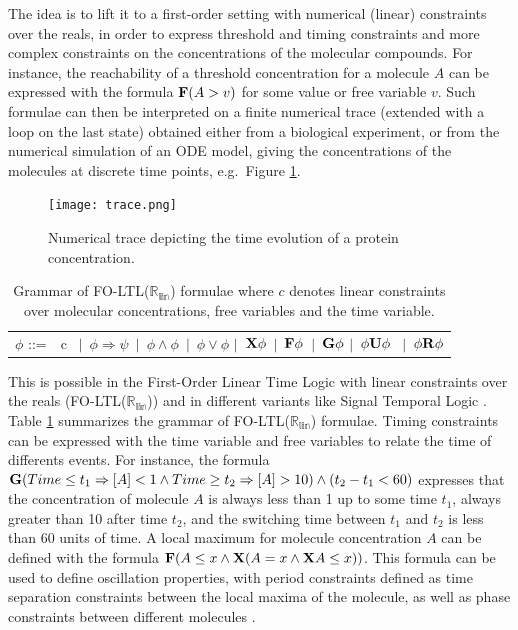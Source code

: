 \documentclass[graybox]{svmult}
\def\Rlin{\mathbb{R_{\mbox{lin}}}}
\def\F{{\bf F}}
\def\G{{\bf G}}
\def\X{{\bf X}}
\def\U{{\bf U}}
\def\R{{\bf R}}
\begin{document}
The idea is to lift it to a first-order setting with numerical (linear) constraints over the reals,
in order to express threshold and timing constraints and more complex constraints on the concentrations of the molecular compounds.
For instance, the reachability of a threshold concentration for a molecule $A$
can be expressed with the formula $\F(A>v)$ for some value or free variable $v$.
Such formulae can then be interpreted on a finite numerical trace (extended with a loop on the last state)
obtained either from a biological experiment, 
or from the numerical simulation of an ODE model,
giving the concentrations of the molecules at discrete time points, e.g.~Figure \ref{trace}.


\begin{figure}[htbp]
\centering
\texttt{[image: trace.png]} %
\caption{ \label{trace} Numerical trace depicting the time evolution of a protein concentration.}
\end{figure}


\begin{table}[htb]
\it
\begin{center}
\begin{tabular}{ll}
$\phi$ ::=& c \ $|$\  $\phi\Rightarrow\psi$\ $|$\  $\phi\wedge\phi$\ $|$\  $\phi\vee\phi$ 
   $|$\   $\X\phi$\ $|$\   $\F\phi$\ $|$\  $ \G\phi$ 
   $|$\  $\phi\U\phi$ \ $|$\  $\phi\R\phi$\\
\end{tabular}
\end{center}
\caption{Grammar of FO-LTL($\Rlin$) formulae where $c$ denotes linear constraints over molecular concentrations,
free variables and the time variable.}
\label{foltl}
\end{table}

This is possible in the First-Order Linear Time Logic with linear constraints over the reals (FO-LTL($\Rlin$))
and in different variants like Signal Temporal Logic \cite{DM10formats}.
Table \ref{foltl} summarizes the grammar of FO-LTL($\Rlin$) formulae.
Timing constraints can be expressed with the time variable and free variables to relate 
the time of differents events.
For instance, the formula $\G(Time\le t_1\Rightarrow[A]<1\wedge Time\ge t_2\Rightarrow[A]>10)\wedge(t_2-t_1<60)$
expresses that the concentration of molecule $A$ is always less than 1 up to some time $t_1$,
always greater than 10 after time $t_2$, and the switching time between $t_1$ and $t_2$ is less than 60 units of time.
A local maximum for molecule concentration $A$ 
can be defined with the formula $\F(A\le x\wedge\X(A=x\wedge\X A\le x))$.
This formula can be used to define oscillation properties, with period constraints
defined as time separation constraints between the local maxima of the molecule,
as well as phase constraints between different molecules \cite{FT14book}.
\end{document}
